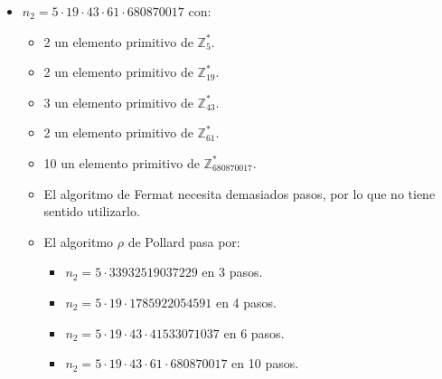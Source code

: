 \begin{enumerate}
\begin{itemize}
			\item $n_2 = 5 \cdot 19 \cdot 43 \cdot 61 \cdot 680870017$ con:
			\begin{itemize}
				\item 2 un elemento primitivo de $\mathbb{Z}^*_{5}$.
				\item 2 un elemento primitivo de $\mathbb{Z}^*_{19}$.
				\item 3 un elemento primitivo de $\mathbb{Z}^*_{43}$.
				\item 2 un elemento primitivo de $\mathbb{Z}^*_{61}$.
				\item 10 un elemento primitivo de $\mathbb{Z}^*_{680870017}$.
				\item El algoritmo de Fermat necesita demasiados pasos, por lo que no tiene sentido utilizarlo.
				\item El algoritmo $\rho$ de Pollard pasa por:
				\begin{itemize}
					\item $n_2 = 5 \cdot 33932519037229$ en 3 pasos.
					\item $n_2 = 5 \cdot 19 \cdot 1785922054591$ en 4 pasos.
					\item $n_2 = 5 \cdot 19 \cdot 43 \cdot 41533071037$ en 6 pasos.
					\item $n_2 = 5 \cdot 19 \cdot 43 \cdot 61 \cdot 680870017$ en 10 pasos.
				\end{itemize}
			\end{itemize}
		\end{itemize}
	\end{enumerate}